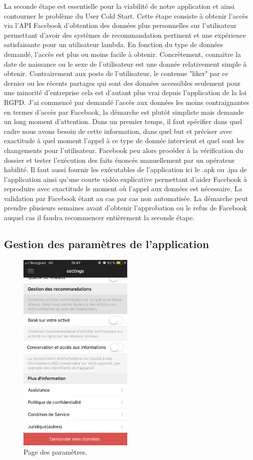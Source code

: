 La seconde étape est essentielle pour la viabilité de notre application et ainsi contourner le problème du User Cold Start. Cette étape consiste à obtenir l'accès via l'API Facebook d'obtention des données plus personnelles sur l'utilisateur permettant d'avoir des systèmes de recommandation pertinent et une expérience satisfaisante pour un utilisateur lambda. En fonction du type de données demandé, l'accès est plus ou moins facile à obtenir. Concrètement, connaitre la date de naissance ou le sexe de l'utilisateur est une donnée relativement simple à obtenir. Contrairement aux posts de l'utilisateur, le contenue "liker" par ce dernier ou les récents partages qui sont des données accessibles seulement pour une minorité d'entreprise cela est d'autant plus vrai depuis l'application de la loi RGPD. J'ai commencé par demandé l'accès aux données les moins contraignantes en termes d'accès par Facebook, la démarche est plutôt simpliste mais demande un long moment d'attention. Dans un premier temps, il faut spécifier dans quel cadre nous avons besoin de cette information, dans quel but et préciser avec exactitude à quel moment l’appel à ce type de donnée intervient et quel sont les changements pour l'utilisateur. Facebook peu alors procéder à la vérification du dossier et tester l’exécution des faits énoncés manuellement par un opérateur habilité. Il faut aussi fournir les exécutables de l'application ici le  .apk ou .ipa de l’application ainsi qu’une courte vidéo explicative permettant d'aider Facebook à reproduire avec exactitude le moment où l’appel aux données est nécessaire. La validation par Facebook étant au cas par cas non automatisée. La démarche peut prendre plusieurs semaines avant d’obtenir l’approbation ou le refus de Facebook auquel cas il faudra recommencer entièrement la seconde étape.


\subsection{Gestion des paramètres de l'application}

\begin{figure}[htp]
  \centering
  \includegraphics[height=10cm]{images/s2}
  \caption{Page des paramètres.}
  \label{fig:screen-settings}
\end{figure}

